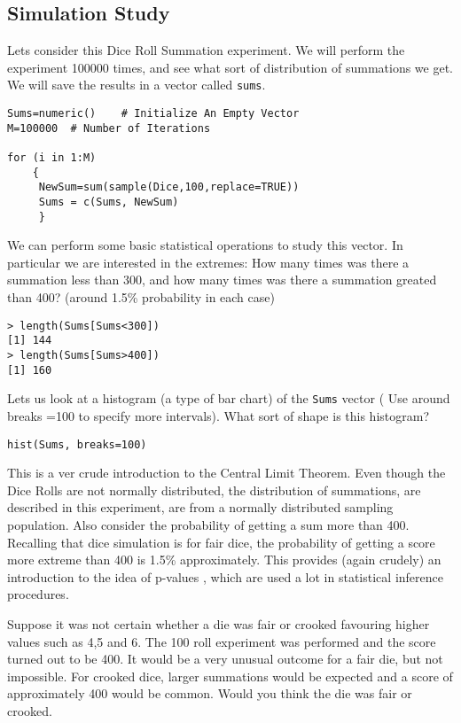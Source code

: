 \documentclass[11pt]{article} %
\begin{document}
\subsection{Simulation Study}
Lets consider this Dice Roll Summation experiment. We will perform the experiment 100000 times, and see what sort of distribution of summations we get.
We will save the results in a vector called \texttt{sums}.
\begin{framed}
\begin{verbatim}
Sums=numeric()    # Initialize An Empty Vector
M=100000  # Number of Iterations

for (i in 1:M)
    {
     NewSum=sum(sample(Dice,100,replace=TRUE))
     Sums = c(Sums, NewSum)
     }
\end{verbatim}
\end{framed}

We can perform some basic statistical operations to study this vector. In particular we are interested in the extremes: How many times was there a summation less than 300, and how many times was there a summation greated than 400? (around 1.5\% probability in each case)

\begin{verbatim}
> length(Sums[Sums<300])
[1] 144
> length(Sums[Sums>400])
[1] 160  
\end{verbatim}

Lets us look at a histogram (a type of bar chart) of the \texttt{Sums} vector ( Use around breaks =100 to specify more intervals). What sort of shape is this histogram?
\begin{framed}
\begin{verbatim}
hist(Sums, breaks=100)
\end{verbatim}
\end{framed}

This is a ver crude introduction to the Central Limit Theorem. Even though the Dice Rolls are not normally distributed, the distribution of summations, are described in this experiment, are from a normally distributed sampling population. Also consider the probability of getting a sum more than 400. Recalling that dice simulation is for fair dice, the probability of getting a score more extreme than 400 is 1.5\% approximately. This provides (again crudely) an introduction to the idea of p-values , which are used a lot in statistical inference procedures. 

Suppose it was not certain whether a die was fair or crooked favouring higher values such as 4,5 and 6. The 100 roll experiment was performed and the score turned out to be 400.  It would be a very unusual outcome for a fair die, but not impossible. For crooked dice, larger summations would be expected and a score of approximately 400 would be common. Would you think the die was fair or crooked.
\end{document}
